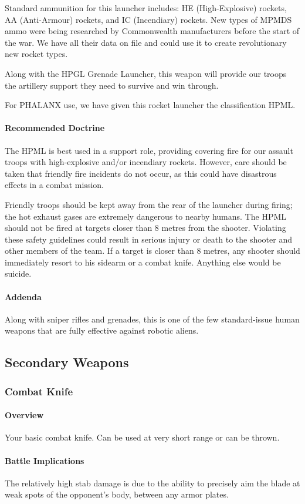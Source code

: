 Standard ammunition for this launcher includes: HE (High-Explosive) rockets, AA (Anti-Armour) rockets, and IC (Incendiary) rockets. New types of MPMDS ammo were being researched by Commonwealth manufacturers before the start of the war. We have all their data on file and could use it to create revolutionary new rocket types.

Along with the HPGL Grenade Launcher, this weapon will provide our troops the artillery support they need to survive and win through.

For PHALANX use, we have given this rocket launcher the classification HPML.
\paragraph*{Recommended Doctrine}
The HPML is best used in a support role, providing covering fire for our assault troops with high-explosive and/or incendiary rockets. However, care should be taken that friendly fire incidents do not occur, as this could have disastrous effects in a combat mission.

Friendly troops should be kept away from the rear of the launcher during firing; the hot exhaust gases are extremely dangerous to nearby humans. The HPML should not be fired at targets closer than 8 metres from the shooter. Violating these safety guidelines could result in serious injury or death to the shooter and other members of the team. If a target is closer than 8 metres, any shooter should immediately resort to his sidearm or a combat knife. Anything else would be suicide.
\paragraph*{Addenda}
Along with sniper rifles and grenades, this is one of the few standard-issue human weapons that are fully effective against robotic aliens.
\subsection{Secondary Weapons}
\subsubsection*{Combat Knife}
\paragraph*{Overview}
Your basic combat knife. Can be used at very short range or can be thrown.
\paragraph*{Battle Implications}
The relatively high stab damage is due to the ability to precisely aim the blade at weak spots of the opponent's body, between any armor plates. 
